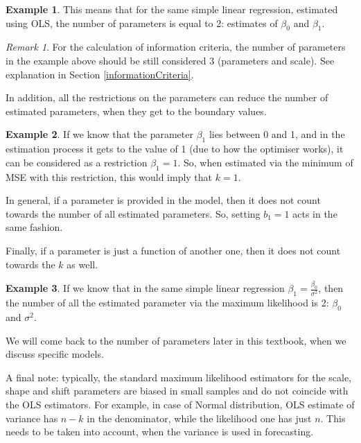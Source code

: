 \documentclass[
]{book}
\theoremstyle{definition}
\theoremstyle{definition}
\newtheorem{example}{Example}[chapter]
\theoremstyle{definition}
\theoremstyle{definition}
\theoremstyle{remark}
\newtheorem*{remark}{Remark}
\begin{document}
\begin{example}
\protect\hypertarget{exm:unnamed-chunk-116}{}\label{exm:unnamed-chunk-116}This means that for the same simple linear regression, estimated using OLS, the number of parameters is equal to 2: estimates of \(\beta_0\) and \(\beta_1\).
\end{example}

\begin{remark}
For the calculation of information criteria, the number of parameters in the example above should be still considered 3 (parameters and scale). See explanation in Section \ref{informationCriteria}.
\end{remark}

In addition, all the restrictions on the parameters can reduce the number of estimated parameters, when they get to the boundary values.

\begin{example}
\protect\hypertarget{exm:unnamed-chunk-117}{}\label{exm:unnamed-chunk-117}If we know that the parameter \(\beta_1\) lies between 0 and 1, and in the estimation process it gets to the value of 1 (due to how the optimiser works), it can be considered as a restriction \(\beta_1=1\). So, when estimated via the minimum of MSE with this restriction, this would imply that \(k=1\).
\end{example}

In general, if a parameter is provided in the model, then it does not count towards the number of all estimated parameters. So, setting \(b_1=1\) acts in the same fashion.

Finally, if a parameter is just a function of another one, then it does not count towards the \(k\) as well.

\begin{example}
\protect\hypertarget{exm:unnamed-chunk-118}{}\label{exm:unnamed-chunk-118}If we know that in the same simple linear regression \(\beta_1 = \frac{\beta_0}{\sigma^2}\), then the number of all the estimated parameter via the maximum likelihood is 2: \(\beta_0\) and \(\sigma^2\).
\end{example}

We will come back to the number of parameters later in this textbook, when we discuss specific models.

A final note: typically, the standard maximum likelihood estimators for the scale, shape and shift parameters are biased in small samples and do not coincide with the OLS estimators. For example, in case of Normal distribution, OLS estimate of variance has \(n-k\) in the denominator, while the likelihood one has just \(n\). This needs to be taken into account, when the variance is used in forecasting.
\end{document}
